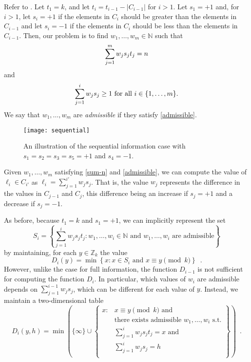 \documentclass{elsart}
\newcommand{\Z}{\mathbb{Z}}
\newcommand{\N}{\mathbb{N}}
\begin{document}
Refer to .
Let $t_1=k$, and let $t_i = t_{i-1}-|C_{i-1}|$ for $i>1$.  Let
$s_1=+1$ and, for $i>1$, let $s_i=+1$ if the elements in $C_{i}$
should be greater than the elements in $C_{i-1}$ and let $s_{i}=-1$ if
the elements in $C_{i}$ should be less than the elements in $C_{i-1}$.
Then, our problem is to find $w_1,\ldots,w_m\in\N$ such
that
\begin{equation}
\sum_{j=1}^m w_js_jt_j = n \eqlabel{sum-n}
\end{equation}
and
\begin{equation}
\sum_{j=1}^i w_js_j \ge 1 \mbox{ for all $i\in\{1,\ldots,m\}$.}
\eqlabel{admissible}
\end{equation}
We say that $w_1,\ldots,w_m$ are \emph{admissible} if they satisfy
\eqref{admissible}.


\begin{figure}
\begin{center}\texttt{[image: sequential]}\end{center}
\caption{An illustration of the sequential information case with
$s_1=s_2=s_3=s_5 = +1$ and $s_4=-1$.}
\end{figure}

Given $w_1,\ldots,w_m$ satisfying \eqref{sum-n} and
\eqref{admissible}, we can compute the value of $\ell_i\in C_{i'}$ as 
$\ell_i =\sum_{j=1}^{i'} w_js_j$.  That is, the value $w_j$ represents the
difference in the values in $C_{j-1}$ and $C_j$, this difference being
an increase if $s_j=+1$ and a decrease if $s_j=-1$.

As before, because $t_1=k$ and $s_1=+1$, we can implicitly represent
the set 
\[
   S_i = \left\{\sum_{j=1}^i w_js_jt_j : 
	\mbox{$w_1,\ldots,w_i\in\mathbb{N}$ and  
		$w_1,\ldots,w_i$ are admissible} \right\}
\]
by maintaining, for each $y\in \Z_k$ the value 
\[
   D_i(y) = \min\left\{x : \mbox{$x\in S_i$ and $x\equiv y\pmod{k}$} \right\}
    \enspace .
\]
However, unlike the case for full information, the function $D_{i-1}$
is not sufficient for computing the function $D_{i}$.  In particular,
which values of $w_i$ are admissible depends on
$\sum_{j=1}^{i-1}w_js_j$, which can be different for each value of $y$.
Instead, we maintain a two-dimensional table
\[
   D_i(y,h) = \min\left(\{\infty\}\cup \left\{
    \begin{array}{ll}
          x: & \mbox{$x\equiv y\pmod{k}$ and} \\
          & \mbox{there exists admissible $w_1,\ldots,w_i$ s.t.} \\
          & \mbox{$\sum_{j=1}^i w_js_jt_j = x$ and} \\
          & \mbox{$\sum_{j=1}^i w_js_j = h$} \\
          
    \end{array}
    \right\}\right)
    \enspace .
\]
\end{document}
